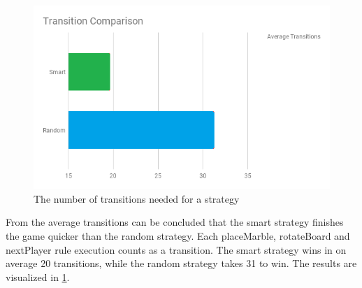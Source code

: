 \begin{figure}[h]
  \centering
  \includegraphics[scale=0.5,clip]{Images/transitions}
  \caption{The number of transitions needed for a strategy}
  \label{fig:transitions}
\end{figure}

From the average transitions can be concluded that the smart strategy finishes the game quicker than the random strategy. Each placeMarble, rotateBoard and nextPlayer rule execution counts as a transition. The smart strategy wins in on average 20 transitions, while the random strategy takes 31 to win. The results are visualized in \ref{fig:transitions}.
